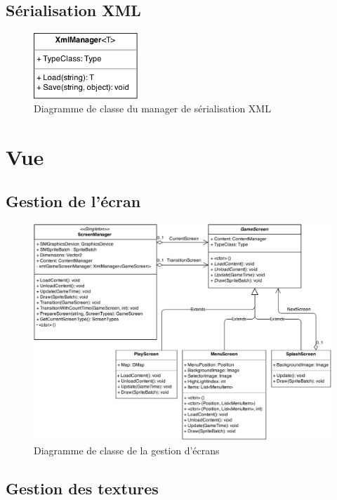 \documentclass[11pt, a4paper, oneside]{report}
\begin{document}
\subsection{Sérialisation XML}
\begin{figure}[H]
	\begin{center}
	\includegraphics[width=0.35\textwidth]{XmlManager}
	\caption{Diagramme de classe du manager de sérialisation XML}
	\label{fig:XmlManager}
	\end{center}
\end{figure}

\section{Vue}
\subsection{Gestion de l'écran}
\begin{figure}[H]
	\begin{center}
	\includegraphics[width=1\textwidth]{screenmanagement}
	\caption{Diagramme de classe de la gestion d'écrans}
	\label{fig:screenmanagement}
	\end{center}
\end{figure}
\subsection{Gestion des textures}
\label{subsec:texturemanager}
\end{document}
